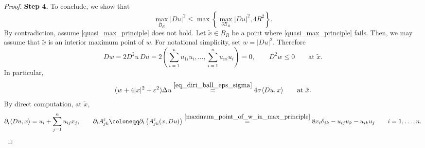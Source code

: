 \documentclass[11pt]{amsart}
\renewcommand{\leq}{\leqslant}
\newcommand{\eps}{\varepsilon}
\newcommand{\Ae}{A^\eps}
\theoremstyle{definition}
\theoremstyle{remark}
\numberwithin{equation}{section}
\begin{document}
\begin{proof}
\smallskip
\noindent \textbf{Step 4.} 
To conclude, we show that 
\begin{equation}\label{quasi_max_principle}
    \max_{\overline B_R} |Du|^2\leq \max\left\{ \max_{\partial B_R} |Du|^2,4R^2\right\}.
\end{equation}
By contradiction, assume \eqref{quasi_max_principle} does not hold. Let $\tilde x\in B_R$ be a point where \eqref{quasi_max_principle} fails. Then, we may assume that $\tilde x$ is an interior maximum point of $w$. For notational simplicity, set $w=|Du|^2$. Therefore
\begin{equation}\label{maximum_point_of_w_in_max_principle}
    Dw=2 D^2 u\,Du=2\left(\sum_{i=1}^n u_{1i} u_i,\ldots,\sum_{i=1}^n u_{ni} u_i\right)=0,\qquad D^2 w\leq 0\qquad\text{at $\tilde x$.}
\end{equation}
In particular, 
\begin{equation}\label{equazione_in_pt_massimo_w_max_principle_34578}
(w+4|x|^2+\eps^2)\Delta u\overset{\eqref{eq_diri_ball_eps_sigma}}{=}4\sigma \langle Du,x\rangle\qquad\text{at $\tilde x$.}
\end{equation}
By direct computation, at $\tilde x$,
\begin{equation}\label{eq_ausiliarie_28486948375}
    \partial _i\langle Du,x\rangle =u_i+\sum_{j=1}^nu_{ij} x_j,\qquad \partial _i \Ae_{jk}\coloneqq \partial_i\left(\Ae_{jk}(x,Du)\right)\overset{\eqref{maximum_point_of_w_in_max_principle}}{=}8x_i\delta_{jk}-u_{ij}u_k-u_{ik}u_j\qquad i=1,\ldots, n.
\end{equation}


\end{proof}
\end{document}
